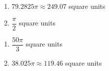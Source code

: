 \begin{multicols}{2}

\begin{enumerate}

\setcounter{enumi}{\value{HW}}

\item $79.2825\pi \approx 249.07$ square units 
\item $\dfrac{\pi}{2}$ square units

\setcounter{HW}{\value{enumi}}

\end{enumerate}

\end{multicols}

\enlargethispage{0.25in}

\vspace{-0.25in}

\begin{multicols}{2}

\begin{enumerate}

\setcounter{enumi}{\value{HW}}

\item $\dfrac{50\pi}{3}$ square units
\item $38.025 \pi \approx 119.46$ square units 

\end{enumerate}

\end{multicols}


